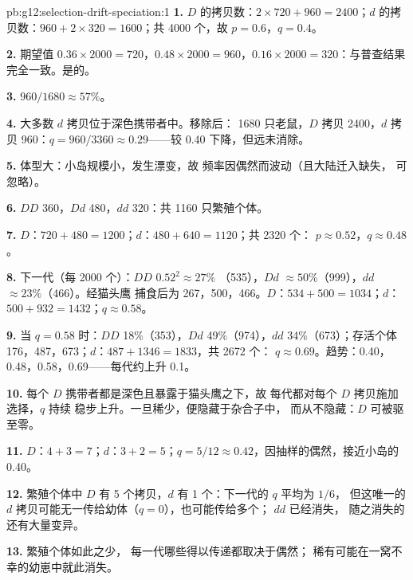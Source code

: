 \begin{solution}{pb:g12:selection-drift-speciation:1}
\textbf{1.} $D$ 的拷贝数：$2 \times 720 + 960 = 2400$；$d$ 的拷贝数：$960 +
2 \times 320 = 1600$；共 4000 个，故 $p = 0.6$，$q = 0.4$。

\textbf{2.} 期望值 $0.36 \times 2000 = 720$，$0.48 \times 2000 =
960$，$0.16 \times 2000 = 320$：与普查结果完全一致。是的。

\textbf{3.} $960/1680 \approx 57\%$。

\textbf{4.} 大多数 $d$ 拷贝位于深色携带者中。移除后：
1680 只老鼠，$D$ 拷贝 2400，$d$ 拷贝 960：$q = 960/3360 \approx
0.29$——较 0.40 下降，但远未消除。

\textbf{5.} 体型大：小岛规模小，发生漂变，故
频率因偶然而波动（且大陆迁入缺失，
可忽略）。

\textbf{6.} $DD$ 360，$Dd$ 480，$dd$ 320：共 1160 只繁殖个体。

\textbf{7.} $D$：$720 + 480 = 1200$；$d$：$480 + 640 = 1120$；共 2320 个：
$p \approx 0.52$，$q \approx 0.48$。

\textbf{8.} 下一代（每 2000 个）：$DD$ $0.52^2 \approx 27\%$
（535），$Dd$ $\approx 50\%$（999），$dd$ $\approx 23\%$（466）。经猫头鹰
捕食后为 267，500，466。$D$：$534 + 500 = 1034$；$d$：$500 + 932 =
1432$；$q \approx 0.58$。

\textbf{9.} 当 $q = 0.58$ 时：$DD$ 18\%（353），$Dd$ 49\%（974），$dd$
34\%（673）；存活个体 176，487，673；$d$：$487 + 1346 = 1833$，共 2672 个：
$q \approx 0.69$。趋势：0.40，0.48，0.58，0.69——每代约上升
0.1。

\textbf{10.} 每个 $D$ 携带者都是深色且暴露于猫头鹰之下，故
每代都对每个 $D$ 拷贝施加选择，$q$ 持续
稳步上升。一旦稀少，便隐藏于杂合子中，
而从不隐藏：$D$ 可被驱至零。

\textbf{11.} $D$：$4 + 3 = 7$；$d$：$3 + 2 = 5$；$q = 5/12 \approx
0.42$，因抽样的偶然，接近小岛的 0.40。

\textbf{12.} 繁殖个体中 $D$ 有 5 个拷贝，$d$ 有 1 个：下一代的 $q$ 平均为 $1/6$，
但这唯一的 $d$ 拷贝可能无一传给幼体（$q = 0$），也可能传给多个；
$dd$ 已经消失，
随之消失的还有大量变异。

\textbf{13.} 繁殖个体如此之少，
每一代哪些得以传递都取决于偶然；
稀有可能在一窝不幸的幼崽中就此消失。


\end{solution}
